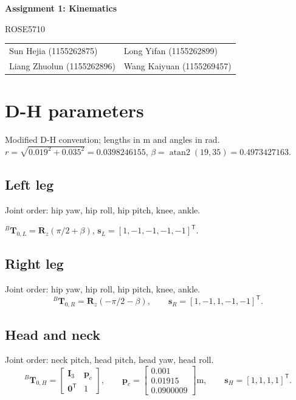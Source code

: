 \documentclass[11pt,a4paper]{article}
\newcommand{\pos}{\mathbf{p}}
\newcommand{\Identity}{\mathbf{I}}
\begin{document}
\setlength{\abovedisplayskip}{4pt}
\setlength{\belowdisplayskip}{4pt}
\setlength{\abovedisplayshortskip}{2pt}
\setlength{\belowdisplayshortskip}{2pt}
\begin{center}
{\LARGE\bfseries Assignment 1: Kinematics}\par
ROSE5710 \par
\begin{tabular}{ll}
Sun Hejia (1155262875) & Long Yifan (1155262899)\\
Liang Zhuolun (1155262896) & Wang Kaiyuan (1155269457)
\end{tabular}
\end{center}

\section{D-H parameters}
Modified D-H convention; lengths in m and angles in rad.
$r=\sqrt{0.019^2+0.035^2}=0.0398246155$,\quad
$\beta=\operatorname{atan2}(19,35)=0.4973427163$.

\subsection{Left leg}
Joint order: hip yaw, hip roll, hip pitch, knee, ankle.

${}^B\mathbf{T}_{0,L}=\mathbf{R}_z(\pi/2+\beta)$,\quad
$\mathbf{s}_L=[1,-1,-1,-1,-1]^{\mathsf T}$.


\clearpage
\subsection{Right leg}
Joint order: hip yaw, hip roll, hip pitch, knee, ankle.
\[
{}^B\mathbf{T}_{0,R}=\mathbf{R}_z(-\pi/2-\beta),\qquad
\mathbf{s}_R=[1,-1,1,-1,-1]^{\mathsf T}.
\]


\clearpage
\subsection{Head and neck}
Joint order: neck pitch, head pitch, head yaw, head roll.
\[
{}^B\mathbf{T}_{0,H}=\begin{bmatrix}
\Identity_3&\pos_c\\\mathbf{0}^{\mathsf T}&1
\end{bmatrix},\qquad
\pos_c=\begin{bmatrix}0.001\\0.01915\\0.0900009\end{bmatrix}\mathrm{m},\qquad
\mathbf{s}_H=[1,1,1,1]^{\mathsf T}.
\]

\end{document}
